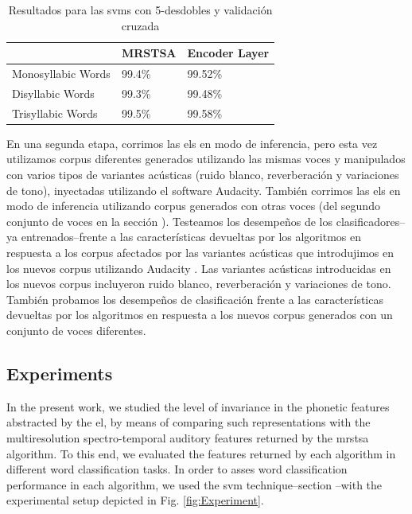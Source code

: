 {\begin{table}[h!]
\centering
\caption{Resultados para las \glspl{svm} con 5-desdobles y validación cruzada}
\begin{tabular}{|l|l|l|}
\hline
		   & MRSTSA & Encoder Layer \\ \hline
Monosyllabic Words & 99.4\% & 99.52\%          \\ \hline
Disyllabic Words   & 99.3\%   & 99.48\%        \\ \hline
Trisyllabic Words  & 99.5\% & 99.58\%          \\ \hline
\end{tabular}
\label{SVM_Training}
\end{table}

En una segunda etapa, corrimos las \glspl{el} en modo de inferencia, pero esta vez utilizamos corpus diferentes generados utilizando las mismas voces y manipulados con varios tipos de variantes acústicas (ruido blanco, reverberación y variaciones de tono), inyectadas utilizando el software Audacity. También corrimos las \glspl{el} en modo de inferencia utilizando corpus generados con otras voces (del segundo conjunto de voces en la sección ). Testeamos los desempeños de los clasificadores--ya entrenados--frente a las características devueltas por los algoritmos en respuesta a los corpus afectados por las variantes acústicas que introdujimos en los nuevos corpus utilizando Audacity \cite{audacity}. Las variantes acústicas introducidas en los nuevos corpus incluyeron ruido blanco, reverberación y variaciones de tono. También probamos los desempeños de clasificación frente a las características devueltas por los algoritmos en respuesta a los nuevos corpus generados con un conjunto de voces diferentes.
}{
\subsection{Experiments}

In the present work, we studied the level of invariance in the phonetic features abstracted by the \gls{el}, by means of comparing such representations with the multiresolution spectro-temporal auditory features returned by the \gls{mrstsa} algorithm. To this end, we evaluated the features returned by each algorithm in different word classification tasks. In order to asses word classification performance in each algorithm, we used the \gls{svm} technique--section --with  the experimental setup depicted in Fig. \ref{fig:Experiment}.

}
